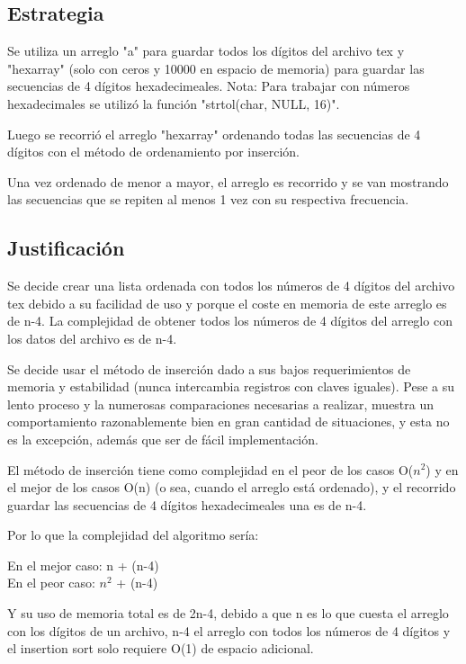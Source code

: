 \documentclass[10pt,letterpaper]{article}
\begin{document}
\subsection{Estrategia}

Se utiliza un arreglo "a" para guardar todos los dígitos del archivo tex y "hexarray" (solo con ceros y 10000 en espacio de memoria) para guardar las secuencias de 4 dígitos hexadecimeales.
Nota: Para trabajar con números hexadecimales se utilizó la función "strtol(char, NULL, 16)". 

Luego se recorrió el arreglo "hexarray" ordenando todas las secuencias de 4 dígitos con el método de ordenamiento por inserción.

Una vez ordenado de menor a mayor, el arreglo es recorrido y se van mostrando las secuencias que se repiten al menos 1 vez con su respectiva frecuencia.

\subsection{Justificación}

Se decide crear una lista ordenada con todos los números de 4 dígitos del archivo tex debido a su facilidad de uso y porque el coste en memoria de este arreglo es de n-4. La complejidad de obtener todos los números de 4 dígitos del arreglo con los datos del archivo es de n-4.

Se decide usar el método de inserción dado a sus bajos requerimientos de memoria y estabilidad (nunca intercambia registros con claves iguales). Pese a su lento proceso y la numerosas comparaciones necesarias a realizar, muestra un comportamiento razonablemente bien en gran cantidad de situaciones, y esta no es la excepción, además que ser de fácil implementación.

El método de inserción tiene como complejidad en el peor de los casos O($n^2$) y en el mejor de los casos O(n) (o sea, cuando el arreglo está ordenado), y el recorrido guardar las secuencias de 4 dígitos hexadecimeales una es de n-4.

Por lo que la complejidad del algoritmo sería: 

En el mejor caso: n + (n-4)
\\
En el peor caso: $n^2$ + (n-4)


Y su uso de memoria total es de 2n-4, debido a que n es lo que cuesta el arreglo con los dígitos de un archivo, n-4 el arreglo con todos los números de 4 dígitos y el insertion sort solo requiere O(1) de espacio adicional.
\end{document}
